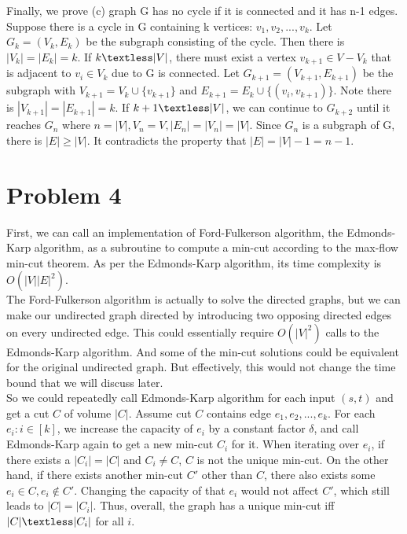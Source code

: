 \documentclass[titlepage, paper=a4, fontsize=11pt]{scrartcl} %
\numberwithin{equation}{section} %
\numberwithin{figure}{section} %
\numberwithin{table}{section} %
\begin{document}
Finally, we prove (c) graph G has no cycle if it is connected and it has n-1 edges. \\
Suppose there is a cycle in G containing k vertices: $v_1, v_2, ... , v_k$. Let $G_k = (V_k, E_k)$ be the subgraph consisting of the cycle. Then there is $|V_k| = |E_k| = k$. If $k \textless |V|$, there must exist a vertex $v_{k+1} \in V - V_k$ that is adjacent to $v_i \in V_k$ due to G is connected. Let $G_{k+1} = (V_{k+1}, E_{k+1})$ be the subgraph with $V_{k+1} = V_k \cup \{v_{k+1}\}$ and $E_{k+1} = E_k \cup \{(v_i, v_{k+1})\}$. Note there is $|V_{k+1}| = |E_{k+1}| = k$. If $k+1 \textless |V|$, we can continue to $G_{k+2}$ until it reaches $G_n$ where $n=|V|, V_n=V, |E_n|=|V_n|=|V|$. Since $G_n$ is a subgraph of G, there is $|E| \geq |V|$. It contradicts the property that $|E|=|V|-1=n-1$. \\




\section*{Problem 4}
First, we can call an implementation of Ford-Fulkerson algorithm, the Edmonds-Karp algorithm, as a subroutine to compute a min-cut according to the max-flow min-cut theorem. As per the Edmonds-Karp algorithm, its time complexity is $O(|V||E|^2)$. \\

The Ford-Fulkerson algorithm is actually to solve the directed graphs, but we can make our undirected graph directed by introducing two opposing directed edges on every undirected edge. This could essentially require $O(|V|^2)$ calls to the Edmonds-Karp algorithm. And some of the min-cut solutions could be equivalent for the original undirected graph. But effectively, this would not change the time bound that we will discuss later. \\

So we could repeatedly call Edmonds-Karp algorithm for each input $(s, t)$ and get a cut $C$ of volume $|C|$. Assume cut $C$ contains edge $e_1, e_2, ... , e_k$. For each $e_i: i \in [k]$, we increase the capacity of $e_i$ by a constant factor $\delta$, and call Edmonds-Karp again to get a new min-cut $C_i$ for it. When iterating over $e_i$, if there exists a $|C_i|=|C|$ and $C_i \neq C$, $C$ is not the unique min-cut. On the other hand, if there exists another min-cut $C'$ other than $C$, there also exists some $e_i \in C, e_i \notin C'$. Changing the capacity of that $e_i$ would not affect $C'$, which still leads to $|C|=|C_i|$. Thus, overall, the graph has a unique min-cut iff $|C| \textless |C_i|$ for all $i$. \\
\end{document}
